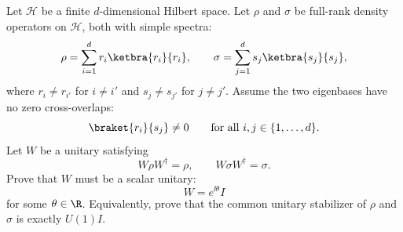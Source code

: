 Let $\mathcal H$ be a finite $d$-dimensional Hilbert space.  Let $\rho$ and $\sigma$ be full-rank density operators on $\mathcal H$, both with simple spectra:
$$
    \rho=\sum_{i=1}^d r_i\ketbra{r_i}{r_i},
    \qquad
    \sigma=\sum_{j=1}^d s_j\ketbra{s_j}{s_j},
$$
where $r_i\neq r_{i'}$ for $i\neq i'$ and $s_j\neq s_{j'}$ for $j\neq j'$.  Assume the two eigenbases have no zero cross-overlaps:
$$
    \braket{r_i}{s_j}\neq0
    \qquad
    \text{for all }i,j\in\{1,\dots,d\}.
$$
Let $W$ be a unitary satisfying
$$
    W\rho W^\dagger=\rho,
    \qquad
    W\sigma W^\dagger=\sigma.
$$
Prove that $W$ must be a scalar unitary:
$$
    W=e^{\ii\theta}I
$$
for some $\theta\in\R$.  Equivalently, prove that the common unitary stabilizer of $\rho$ and $\sigma$ is exactly $U(1)I$.
